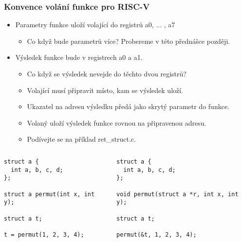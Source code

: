 \documentclass{beamer}
\begin{document}
\begin{frame}[fragile]
\frametitle{Konvence volání funkce pro RISC-V}

\begin{itemize}
 \item Parametry funkce uloží volající do registrů a0, ... , a7
\begin{itemize}
 \item Co když bude parametrů více? Probereme v této přednášce později.
\end{itemize}
 \item Výsledek funkce bude v registrech a0 a a1.
\begin{itemize}
 \item Co když se výsledek nevejde do těchto dvou registrů?
 \item Volající musí připravit místo, kam se výsledek uloží.
 \item Ukazatel na adresu výsledku předá jako skrytý parametr do funkce.
 \item Volaný uloží výsledek funkce rovnou na připravenou adresu.
 \item Podívejte se na příklad ret\_struct.c.
\end{itemize}
\end{itemize}

\begin{columns}
\begin{column}{0.45\textwidth}  
\begin{verbatim}
struct a {
  int a, b, c, d;
};

struct a permut(int x, int y);

struct a t;

t = permut(1, 2, 3, 4);
\end{verbatim}
\end{column}
\begin{column}{0.55\textwidth}  
\begin{verbatim}
struct a {
  int a, b, c, d;
};

void permut(struct a *r, int x, int y);

struct a t;

permut(&t, 1, 2, 3, 4);
\end{verbatim}
\end{column}
\end{columns}
\end{frame}
\end{document}
